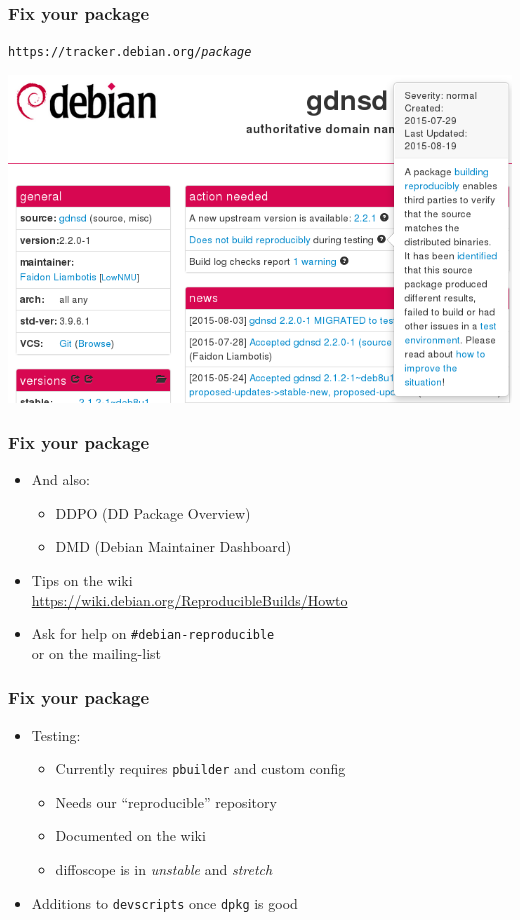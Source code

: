 \documentclass[14pt]{beamer}
\begin{document}
\begin{frame}
 \frametitle{Fix your package}

 \begin{center}
  \texttt{https://tracker.debian.org/\textit{package}}

  \includegraphics[width=0.8\linewidth]{images/tracker-gdnsd.png}
 \end{center}
\end{frame}

\begin{frame}
 \frametitle{Fix your package}

 \begin{itemize}
  \item And also:
   \begin{itemize}
    \item DDPO (DD Package Overview)
    \item DMD (Debian Maintainer Dashboard)
   \end{itemize}
  \item Tips on the wiki \\
   {\small \url{https://wiki.debian.org/ReproducibleBuilds/Howto}}
  \item Ask for help on \texttt{\#debian-reproducible} \\
   or on the mailing-list
 \end{itemize}
\end{frame}

\begin{frame}
 \frametitle{Fix your package}

 \begin{itemize}
  \item Testing:
   \begin{itemize}
    \item Currently requires \texttt{pbuilder} and custom config
    \item Needs our “reproducible” repository
    \item Documented on the wiki
    \item diffoscope is in \textit{unstable} and \textit{stretch}
   \end{itemize}
  \item Additions to \texttt{devscripts} once \texttt{dpkg} is good
 \end{itemize}
\end{frame}
\end{document}
